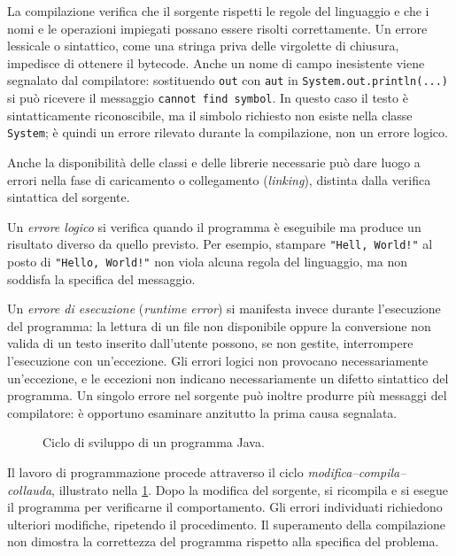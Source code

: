 La compilazione verifica che il sorgente rispetti le regole del
linguaggio e che i nomi e le operazioni impiegati possano essere
risolti correttamente. Un errore lessicale o sintattico, come
una stringa priva delle virgolette di chiusura, impedisce di
ottenere il bytecode. Anche un nome di campo inesistente viene
segnalato dal compilatore: sostituendo \texttt{out} con
\texttt{aut} in \texttt{System.out.println(...)} si può ricevere
il messaggio \texttt{cannot find symbol}. In questo caso il testo
è sintatticamente riconoscibile, ma il simbolo richiesto non
esiste nella classe \texttt{System}; è quindi un errore
rilevato durante la compilazione, non un errore logico.

Anche la disponibilità delle classi e delle librerie necessarie
può dare luogo a errori nella fase di caricamento o collegamento
(\emph{linking}), distinta dalla verifica sintattica del sorgente.

Un \emph{errore logico} si verifica quando il programma è eseguibile
ma produce un risultato diverso da quello previsto. Per esempio,
stampare \texttt{"Hell, World!"} al posto di
\texttt{"Hello, World!"} non viola alcuna regola del linguaggio,
ma non soddisfa la specifica del messaggio.

Un \emph{errore di esecuzione} (\emph{runtime error}) si manifesta
invece durante l'esecuzione del programma: la lettura di un file
non disponibile oppure la conversione non valida di un testo
inserito dall'utente possono, se non gestite, interrompere
l'esecuzione con un'eccezione. Gli errori logici non provocano
necessariamente un'eccezione, e le eccezioni non indicano
necessariamente un difetto sintattico del programma.
Un singolo errore nel sorgente può inoltre produrre più
messaggi del compilatore: è opportuno esaminare anzitutto
la prima causa segnalata.

\begin{figure}[htbp]
  \centering
  
  \caption{Ciclo di sviluppo di un programma Java.}
  \label{fig:fi-java-ciclo-sviluppo}
\end{figure}

Il lavoro di programmazione procede attraverso il ciclo
\emph{modifica--compila--collauda}, illustrato nella
\cref{fig:fi-java-ciclo-sviluppo}. Dopo la modifica del sorgente,
si ricompila e si esegue il programma per verificarne il
comportamento. Gli errori individuati richiedono ulteriori
modifiche, ripetendo il procedimento. Il superamento della
compilazione non dimostra la correttezza del programma rispetto
alla specifica del problema.

